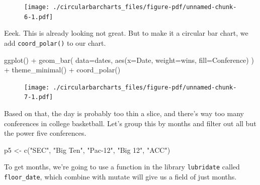\documentclass[
  letterpaper,
  DIV=11,
  numbers=noendperiod]{scrreprt}
\newenvironment{Shaded}{\begin{snugshade}}{\end{snugshade}}
\newcommand{\AttributeTok}[1]{\textcolor[rgb]{0.40,0.45,0.13}{#1}}
\newcommand{\FunctionTok}[1]{\textcolor[rgb]{0.28,0.35,0.67}{#1}}
\newcommand{\NormalTok}[1]{\textcolor[rgb]{0.00,0.23,0.31}{#1}}
\newcommand{\OtherTok}[1]{\textcolor[rgb]{0.00,0.23,0.31}{#1}}
\newcommand{\SpecialCharTok}[1]{\textcolor[rgb]{0.37,0.37,0.37}{#1}}
\newcommand{\StringTok}[1]{\textcolor[rgb]{0.13,0.47,0.30}{#1}}
\begin{document}
\begin{figure}[H]

{\centering \texttt{[image: ./circularbarcharts\_files/figure-pdf/unnamed-chunk-6-1.pdf]}

}

\end{figure}

Eeek. This is already looking not great. But to make it a circular bar
chart, we add \texttt{coord\_polar()} to our chart.

\begin{Shaded}
\begin{Highlighting}[]
\FunctionTok{ggplot}\NormalTok{() }\SpecialCharTok{+} 
  \FunctionTok{geom\_bar}\NormalTok{(}
    \AttributeTok{data=}\NormalTok{dates, }
    \FunctionTok{aes}\NormalTok{(}\AttributeTok{x=}\NormalTok{Date, }\AttributeTok{weight=}\NormalTok{wins, }\AttributeTok{fill=}\NormalTok{Conference)}
\NormalTok{    ) }\SpecialCharTok{+} 
  \FunctionTok{theme\_minimal}\NormalTok{() }\SpecialCharTok{+} 
  \FunctionTok{coord\_polar}\NormalTok{()}
\end{Highlighting}
\end{Shaded}

\begin{figure}[H]

{\centering \texttt{[image: ./circularbarcharts\_files/figure-pdf/unnamed-chunk-7-1.pdf]}

}

\end{figure}

Based on that, the day is probably too thin a slice, and there's way too
many conferences in college basketball. Let's group this by months and
filter out all but the power five conferences.

\begin{Shaded}
\begin{Highlighting}[]
\NormalTok{p5 }\OtherTok{\textless{}{-}} \FunctionTok{c}\NormalTok{(}\StringTok{"SEC"}\NormalTok{, }\StringTok{"Big Ten"}\NormalTok{, }\StringTok{"Pac{-}12"}\NormalTok{, }\StringTok{"Big 12"}\NormalTok{, }\StringTok{"ACC"}\NormalTok{)}
\end{Highlighting}
\end{Shaded}

To get months, we're going to use a function in the library
\texttt{lubridate} called \texttt{floor\_date}, which combine with
mutate will give us a field of just months.
\end{document}
